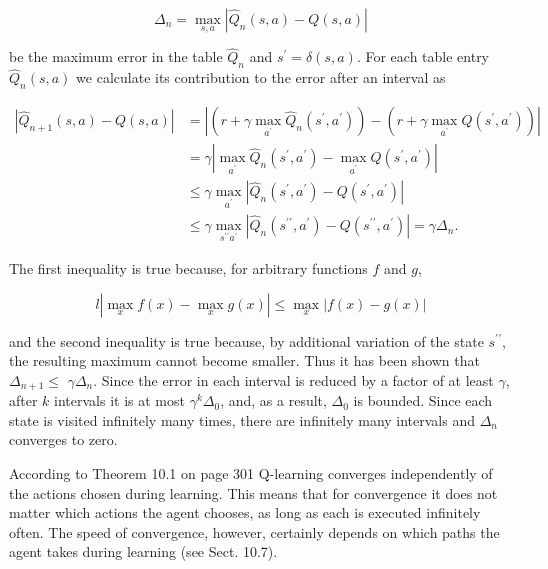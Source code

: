 \documentclass[10pt]{book}
\begin{document}
$$
\Delta_{n}=\max _{s, a}\left|\hat{Q}_{n}(s, a)-Q(s, a)\right|
$$

be the maximum error in the table $\hat{Q}_{n}$ and $s^{\prime}=\delta(s, a)$. For each table entry $\hat{Q}_{n}(s, a)$ we calculate its contribution to the error after an interval as


$$
\begin{aligned}
\left|\hat{Q}_{n+1}(s, a)-Q(s, a)\right| & =\left|\left(r+\gamma \max _{a^{\prime}} \hat{Q}_{n}\left(s^{\prime}, a^{\prime}\right)\right)-\left(r+\gamma \max _{a^{\prime}} Q\left(s^{\prime}, a^{\prime}\right)\right)\right| \\
& =\gamma\left|\max _{a^{\prime}} \hat{Q}_{n}\left(s^{\prime}, a^{\prime}\right)-\max _{a^{\prime}} Q\left(s^{\prime}, a^{\prime}\right)\right| \\
& \leq \gamma \max _{a^{\prime}}\left|\hat{Q}_{n}\left(s^{\prime}, a^{\prime}\right)-Q\left(s^{\prime}, a^{\prime}\right)\right| \\
& \leq \gamma \max _{s^{\prime \prime} a^{\prime}}\left|\hat{Q}_{n}\left(s^{\prime \prime}, a^{\prime}\right)-Q\left(s^{\prime \prime}, a^{\prime}\right)\right|=\gamma \Delta_{n} .
\end{aligned}
$$

The first inequality is true because, for arbitrary functions $f$ and $g$,

$$
l\left|\max _{x} f(x)-\max _{x} g(x)\right| \leq \max _{x}|f(x)-g(x)|
$$

and the second inequality is true because, by additional variation of the state $s^{\prime \prime}$, the resulting maximum cannot become smaller. Thus it has been shown that $\Delta_{n+1} \leq$ $\gamma \Delta_{n}$. Since the error in each interval is reduced by a factor of at least $\gamma$, after $k$ intervals it is at most $\gamma^{k} \Delta_{0}$, and, as a result, $\Delta_{0}$ is bounded. Since each state is visited infinitely many times, there are infinitely many intervals and $\Delta_{n}$ converges to zero.

According to Theorem 10.1 on page 301 Q-learning converges independently of the actions chosen during learning. This means that for convergence it does not matter which actions the agent chooses, as long as each is executed infinitely often. The speed of convergence, however, certainly depends on which paths the agent takes during learning (see Sect. 10.7).
\end{document}
